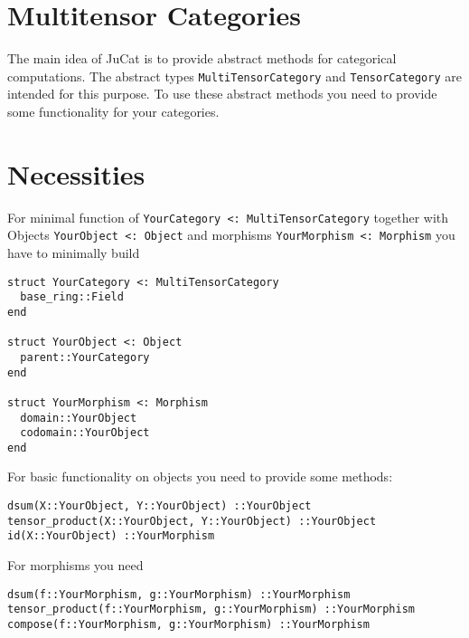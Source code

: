 \documentclass{memoir}
\begin{document}
\hypertarget{3429443789683603020}{}


\chapter{Multitensor Categories}



The main idea of JuCat is to provide abstract methods for categorical computations. The abstract types \texttt{MultiTensorCategory} and \texttt{TensorCategory} are intended for this purpose. To use these abstract methods you need to provide some functionality for your categories.



\hypertarget{16292526960150728896}{}


\chapter{Necessities}



For minimal function of \texttt{YourCategory <: MultiTensorCategory} together with Objects \texttt{YourObject <: Object} and morphisms \texttt{YourMorphism <: Morphism} you have to minimally build




\begin{verbatim}
struct YourCategory <: MultiTensorCategory
  base_ring::Field
end

struct YourObject <: Object
  parent::YourCategory
end

struct YourMorphism <: Morphism
  domain::YourObject
  codomain::YourObject
end
\end{verbatim}



For basic functionality on objects you need to provide some methods:




\begin{lstlisting}
dsum(X::YourObject, Y::YourObject) ::YourObject
tensor_product(X::YourObject, Y::YourObject) ::YourObject
id(X::YourObject) ::YourMorphism
\end{lstlisting}



For morphisms you need




\begin{lstlisting}
dsum(f::YourMorphism, g::YourMorphism) ::YourMorphism
tensor_product(f::YourMorphism, g::YourMorphism) ::YourMorphism
compose(f::YourMorphism, g::YourMorphism) ::YourMorphism
\end{lstlisting}
\end{document}
